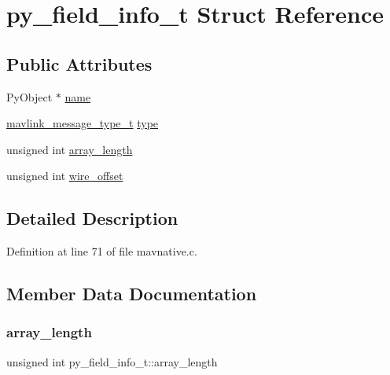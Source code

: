 \hypertarget{structpy__field__info__t}{}\section{py\+\_\+field\+\_\+info\+\_\+t Struct Reference}
\label{structpy__field__info__t}
\subsection*{Public Attributes}
\begin{DoxyCompactItemize}
\item 
Py\+Object $\ast$ \mbox{\hyperlink{structpy__field__info__t_a2608498cd76834f44e809bdbab8a15ae}{name}}
\item 
\mbox{\hyperlink{include__v0_89_2mavlink__types_8h_ab6045b7adc25bdc05a5011a91dc645a4}{mavlink\+\_\+message\+\_\+type\+\_\+t}} \mbox{\hyperlink{structpy__field__info__t_a2b210dc8b7cf956da25e5ca9566ab592}{type}}
\item 
unsigned int \mbox{\hyperlink{structpy__field__info__t_af8648cb704f468d769ff9884117e8770}{array\+\_\+length}}
\item 
unsigned int \mbox{\hyperlink{structpy__field__info__t_a93feb91fe24f3c37a6154f1af3c58f56}{wire\+\_\+offset}}
\end{DoxyCompactItemize}


\subsection{Detailed Description}


Definition at line 71 of file mavnative.\+c.



\subsection{Member Data Documentation}
\mbox{\label{structpy__field__info__t_af8648cb704f468d769ff9884117e8770}} 
\subsubsection{\texorpdfstring{array\_length}{array\_length}}
{\footnotesize\ttfamily unsigned int py\+\_\+field\+\_\+info\+\_\+t\+::array\+\_\+length}



